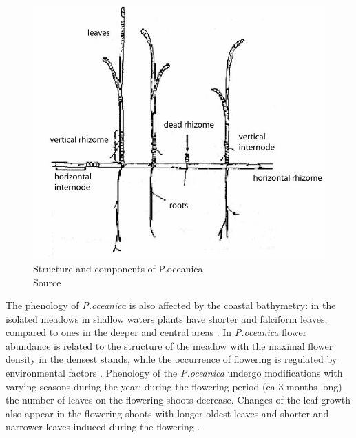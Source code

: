 \documentclass[10pt, a4paper]{article}
\begin{document}
\begin{figure}
	\centering
	\includegraphics[scale=0.15]{Fig-1-8.jpg}
	\caption{Structure and components of P.oceanica \\ Source \cite{DiCarlo04}\label{DiCarlo04}}
	\label{fig:8}
\end{figure}

The phenology of \textit{P.oceanica} is also affected by the coastal bathymetry: in the isolated meadows in
shallow waters plants have shorter and falciform leaves, compared to ones in the deeper and central
areas \cite{Dural10}\label{Dural10}. In \textit{P.oceanica} flower abundance is related to the structure of the meadow with
the maximal flower density in the densest stands, while the occurrence of flowering is regulated by
environmental factors \cite{Buia91}\label{Buia91}. Phenology of the \textit{P.oceanica} undergo
modifications with varying seasons during the year: during the flowering period (ca 3 months long)
the number of leaves on the flowering shoots decrease. Changes of the leaf growth also appear in the
flowering shoots with longer oldest leaves and shorter and narrower leaves induced during the
flowering \cite{Gobert01}\label{Gobert01}.
\end{document}

